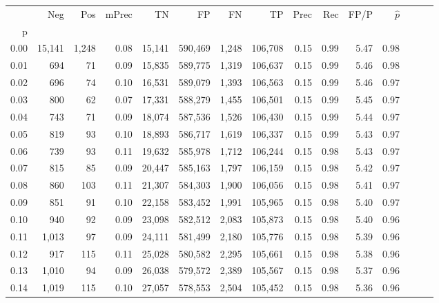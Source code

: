 \begin{tabular}{rrrrrrrrrrrrrrr}
\toprule
{} &     Neg &    Pos & mPrec &       TN &       FP &       FN &       TP &  Prec &   Rec &  FP/P & $\hat{p}$ \\
p    &         &        &       &          &          &          &          &       &       &       &           \\
\midrule
0.00 &  15,141 &  1,248 &  0.08 &   15,141 &  590,469 &    1,248 &  106,708 &  0.15 &  0.99 &  5.47 &      0.98 \\
0.01 &     694 &     71 &  0.09 &   15,835 &  589,775 &    1,319 &  106,637 &  0.15 &  0.99 &  5.46 &      0.98 \\
0.02 &     696 &     74 &  0.10 &   16,531 &  589,079 &    1,393 &  106,563 &  0.15 &  0.99 &  5.46 &      0.97 \\
0.03 &     800 &     62 &  0.07 &   17,331 &  588,279 &    1,455 &  106,501 &  0.15 &  0.99 &  5.45 &      0.97 \\
0.04 &     743 &     71 &  0.09 &   18,074 &  587,536 &    1,526 &  106,430 &  0.15 &  0.99 &  5.44 &      0.97 \\
0.05 &     819 &     93 &  0.10 &   18,893 &  586,717 &    1,619 &  106,337 &  0.15 &  0.99 &  5.43 &      0.97 \\
0.06 &     739 &     93 &  0.11 &   19,632 &  585,978 &    1,712 &  106,244 &  0.15 &  0.98 &  5.43 &      0.97 \\
0.07 &     815 &     85 &  0.09 &   20,447 &  585,163 &    1,797 &  106,159 &  0.15 &  0.98 &  5.42 &      0.97 \\
0.08 &     860 &    103 &  0.11 &   21,307 &  584,303 &    1,900 &  106,056 &  0.15 &  0.98 &  5.41 &      0.97 \\
0.09 &     851 &     91 &  0.10 &   22,158 &  583,452 &    1,991 &  105,965 &  0.15 &  0.98 &  5.40 &      0.97 \\
0.10 &     940 &     92 &  0.09 &   23,098 &  582,512 &    2,083 &  105,873 &  0.15 &  0.98 &  5.40 &      0.96 \\
0.11 &   1,013 &     97 &  0.09 &   24,111 &  581,499 &    2,180 &  105,776 &  0.15 &  0.98 &  5.39 &      0.96 \\
0.12 &     917 &    115 &  0.11 &   25,028 &  580,582 &    2,295 &  105,661 &  0.15 &  0.98 &  5.38 &      0.96 \\
0.13 &   1,010 &     94 &  0.09 &   26,038 &  579,572 &    2,389 &  105,567 &  0.15 &  0.98 &  5.37 &      0.96 \\
0.14 &   1,019 &    115 &  0.10 &   27,057 &  578,553 &    2,504 &  105,452 &  0.15 &  0.98 &  5.36 &      0.96 \\

\end{tabular}
